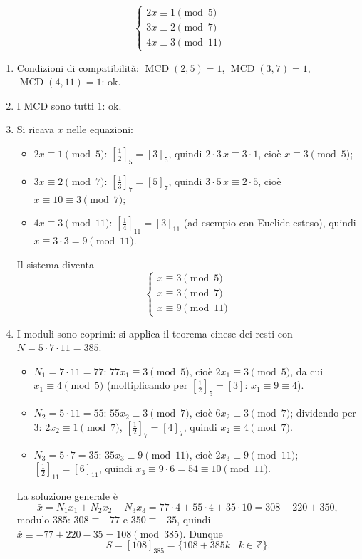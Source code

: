 \documentclass[11pt,a4paper]{article}
\begin{document}
\begin{esempio}
\[
  \begin{cases} 2x \equiv 1 \pmod 5 \\ 3x \equiv 2 \pmod 7 \\ 4x \equiv 3 \pmod{11} \end{cases}
\]
\begin{enumerate}
  \item Condizioni di compatibilità: $\operatorname{MCD}(2, 5) = 1$, $\operatorname{MCD}(3, 7) = 1$, $\operatorname{MCD}(4, 11) = 1$: ok.
  \item I MCD sono tutti $1$: ok.
  \item Si ricava $x$ nelle equazioni:
  \begin{itemize}
    \item $2x \equiv 1 \pmod 5$: $\left[\tfrac{1}{2}\right]_5 = [3]_5$, quindi $2\cdot 3\,x \equiv 3\cdot 1$, cioè $x \equiv 3 \pmod 5$;
    \item $3x \equiv 2 \pmod 7$: $\left[\tfrac{1}{3}\right]_7 = [5]_7$, quindi $3\cdot 5\,x \equiv 2\cdot 5$, cioè $x \equiv 10 \equiv 3 \pmod 7$;
    \item $4x \equiv 3 \pmod{11}$: $\left[\tfrac{1}{4}\right]_{11} = [3]_{11}$ (ad esempio con Euclide esteso), quindi $x \equiv 3\cdot 3 = 9 \pmod{11}$.
  \end{itemize}
  Il sistema diventa
  \[
    \begin{cases} x \equiv 3 \pmod 5 \\ x \equiv 3 \pmod 7 \\ x \equiv 9 \pmod{11} \end{cases}
  \]
  \item I moduli sono coprimi: si applica il teorema cinese dei resti con $N = 5\cdot 7\cdot 11 = 385$.
  \begin{itemize}
    \item $N_1 = 7\cdot 11 = 77$: $77x_1 \equiv 3 \pmod 5$, cioè $2x_1 \equiv 3 \pmod 5$, da cui $x_1 \equiv 4 \pmod 5$ (moltiplicando per $\left[\tfrac{1}{2}\right]_5 = [3]$: $x_1 \equiv 9 \equiv 4$).
    \item $N_2 = 5\cdot 11 = 55$: $55x_2 \equiv 3 \pmod 7$, cioè $6x_2 \equiv 3 \pmod 7$; dividendo per $3$: $2x_2 \equiv 1 \pmod 7$, $\left[\tfrac{1}{2}\right]_7 = [4]_7$, quindi $x_2 \equiv 4 \pmod 7$.
    \item $N_3 = 5\cdot 7 = 35$: $35x_3 \equiv 9 \pmod{11}$, cioè $2x_3 \equiv 9 \pmod{11}$; $\left[\tfrac{1}{2}\right]_{11} = [6]_{11}$, quindi $x_3 \equiv 9\cdot 6 = 54 \equiv 10 \pmod{11}$.
  \end{itemize}
  La soluzione generale è
  \[
    \bar{x} = N_1x_1 + N_2x_2 + N_3x_3 = 77\cdot 4 + 55\cdot 4 + 35\cdot 10 = 308 + 220 + 350,
  \]
  modulo $385$: $308 \equiv -77$ e $350 \equiv -35$, quindi $\bar{x} \equiv -77 + 220 - 35 = 108 \pmod{385}$. Dunque
  \[
    S = [108]_{385} = \{108 + 385k \mid k \in \mathbb{Z}\}.
  \]
\end{enumerate}
\end{esempio}
\end{document}

